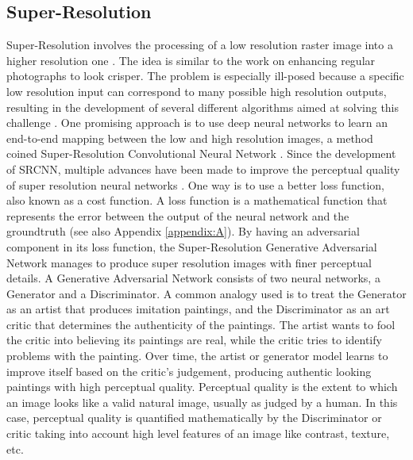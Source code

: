 \documentclass[tc, manuscript]{copernicus}
\begin{document}
\subsection{Super-Resolution} \label{section:superresolution}

Super-Resolution involves the processing of a low resolution raster image into a higher resolution one \citep{TsaiMultiframeimagerestoration1984}.
The idea is similar to the work on enhancing regular photographs to look crisper.
The problem is especially ill-posed because a specific low resolution input can correspond to many possible high resolution outputs, resulting in the development of several different algorithms aimed at solving this challenge \citep[see][for a review]{NasrollahiSuperresolutioncomprehensivesurvey2014}.
One promising approach is to use deep neural networks \citep{LeCunDeeplearning2015} to learn an end-to-end mapping between the low and high resolution images, a method coined Super-Resolution Convolutional Neural Network \citep[SRCNN,][]{DongImageSuperResolutionUsing2014}.
Since the development of SRCNN, multiple advances have been made to improve the perceptual quality of super resolution neural networks \cite[see][for a review]{YangDeepLearningSingle2019}.
One way is to use a better loss function, also known as a cost function.
A loss function is a mathematical function that represents the error between the output of the neural network and the groundtruth (see also Appendix \ref{appendix:A}).
By having an adversarial component in its loss function, the Super-Resolution Generative Adversarial Network \citep[SRGAN,][]{LedigPhotoRealisticSingleImage2017} manages to produce super resolution images with finer perceptual details.
A Generative Adversarial Network \citep{GoodfellowGenerativeAdversarialNetworks2014} consists of two neural networks, a Generator and a Discriminator.
A common analogy used is to treat the Generator as an artist that produces imitation paintings, and the Discriminator as an art critic that determines the authenticity of the paintings.
The artist wants to fool the critic into believing its paintings are real, while the critic tries to identify problems with the painting.
Over time, the artist or generator model learns to improve itself based on the critic's judgement, producing authentic looking paintings with high perceptual quality.
Perceptual quality is the extent to which an image looks like a valid natural image, usually as judged by a human.
In this case, perceptual quality is quantified mathematically by the Discriminator or critic taking into account high level features of an image like contrast, texture, etc.
\end{document}
